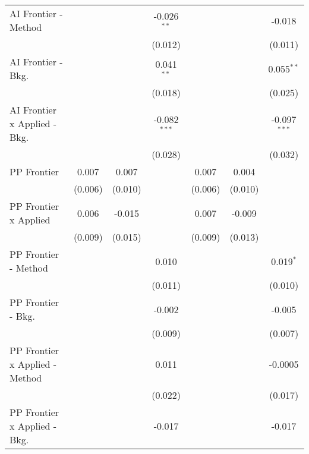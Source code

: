 \begin{tabular}{lcccccc}
   AI Frontier - Method           &         &              & -0.026$^{**}$  &         &                & -0.018\\   
                                  &         &              & (0.012)        &         &                & (0.011)\\   
   AI Frontier - Bkg.             &         &              & 0.041$^{**}$   &         &                & 0.055$^{**}$\\   
                                  &         &              & (0.018)        &         &                & (0.025)\\   
   AI Frontier x Applied - Bkg.   &         &              & -0.082$^{***}$ &         &                & -0.097$^{***}$\\   
                                  &         &              & (0.028)        &         &                & (0.032)\\   
   PP Frontier                    & 0.007   & 0.007        &                & 0.007   & 0.004          &   \\   
                                  & (0.006) & (0.010)      &                & (0.006) & (0.010)        &   \\   
   PP Frontier x Applied          & 0.006   & -0.015       &                & 0.007   & -0.009         &   \\   
                                  & (0.009) & (0.015)      &                & (0.009) & (0.013)        &   \\   
   PP Frontier - Method           &         &              & 0.010          &         &                & 0.019$^{*}$\\   
                                  &         &              & (0.011)        &         &                & (0.010)\\   
   PP Frontier - Bkg.             &         &              & -0.002         &         &                & -0.005\\   
                                  &         &              & (0.009)        &         &                & (0.007)\\   
   PP Frontier x Applied - Method &         &              & 0.011          &         &                & -0.0005\\   
                                  &         &              & (0.022)        &         &                & (0.017)\\   
   PP Frontier x Applied - Bkg.   &         &              & -0.017         &         &                & -0.017\\   

\end{tabular}

